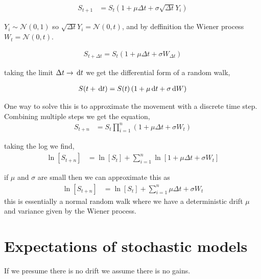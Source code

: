 \begin{align*}
    S_{t+1} &= S_t\left(1 + \mu \Delta t + \sigma \sqrt{\Delta t} Y_i\right)
\end{align*}

$Y_i\sim \mathcal{N}(0,1)$ so $\sqrt{\Delta t} Y_i = \mathcal{N}(0,t)$, and by deffinition the Wiener process $W_t = \mathcal{N}(0,t)$.

\begin{align*}
    S_{t+\Delta t} = S_t\left(1 + \mu \Delta t + \sigma  W_{\Delta t}\right)
\end{align*}

taking the limit $\Delta t \to \,\mathrm{d} t$ we get the differential form of a random walk,

\begin{align*}
    S(t+\,\mathrm{d} t) = S(t)\left(1 + \mu \,\mathrm{d} t + \sigma  \,\mathrm{d} W \right)
\end{align*}

One way to solve this is to approximate the movement with a discrete time step. Combining multiple steps we get the equation,
\begin{align*}
    S_{t+n} &= S_t \prod_{i=1}^{n}\left(1 + \mu \Delta t + \sigma W_t\right)
\end{align*}

taking the log we find,
\begin{align*}
    \ln[S_{t+n}] &= \ln[S_t] + \sum_{i=1}^{n} \ln[1 + \mu \Delta t + \sigma W_t]
\end{align*}

if $\mu$ and $\sigma$ are small then we can approximate this as
\begin{align*}
    \ln[S_{t+n}] &= \ln[S_t] + \sum_{i=1}^{n} \mu \Delta t + \sigma W_t
\end{align*}
this is essentially a normal random walk where we have a deterministic drift $\mu$ and variance given by the Wiener process.

\section{Expectations of stochastic models}

If we presume there is no drift we assume there is no gains.
